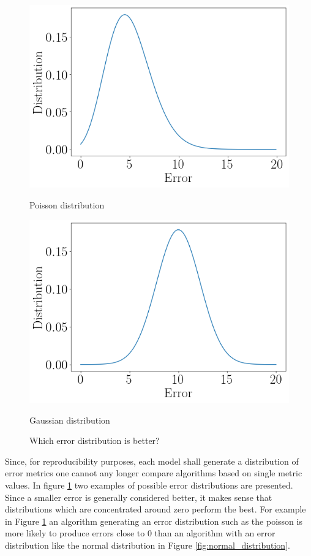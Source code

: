 \begin{figure}[htb]
    \centering
    \includegraphics[width=\linewidth]{./img/poisson_distribution.png}
    \caption{Poisson distribution}
    \label{fig:poisson_distribution}
    \endminipage\hfill
    \includegraphics[width=\linewidth]{./img/normal_distribution.png}
    \caption{Gaussian distribution}
    \label{fig:normal_distribution}
    \endminipage\hfill
    \caption{Which error distribution is better?}
    \label{fig:example_distributions}
\end{figure}


Since, for reproducibility purposes, each model shall generate a distribution of error metrics one cannot any longer compare algorithms based on single metric values. In figure \ref{fig:example_distributions} two examples of possible error distributions are presented. Since a smaller error is generally considered better, it makes sense that distributions which are concentrated around zero perform the best. For example in Figure \ref{fig:example_distributions} an algorithm generating an error distribution such as the poisson is more likely to produce errors close to 0 than an algorithm with an error distribution like the normal distribution in Figure \ref{fig:normal_distribution}.

